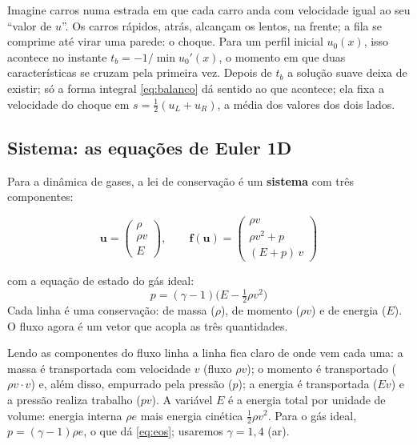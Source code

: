 \documentclass[10pt,a4paper]{article}
\newcommand{\vu}{\mathbf{u}}
\newcommand{\vf}{\mathbf{f}}
\begin{document}
\begin{intuicao}
Imagine carros numa estrada em que cada carro anda com velocidade igual ao seu ``valor de $u$''. Os carros rápidos, atrás, alcançam os lentos, na frente; a fila se comprime até virar uma parede: o choque. Para um perfil inicial $u_0(x)$, isso acontece no instante $t_b=-1/\min u_0'(x)$, o momento em que duas características se cruzam pela primeira vez. Depois de $t_b$ a solução suave deixa de existir; só a forma integral \eqref{eq:balanco} dá sentido ao que acontece; ela fixa a velocidade do choque em $s=\tfrac12(u_L+u_R)$, a média dos valores dos dois lados.
\end{intuicao}

\subsection{Sistema: as equações de Euler 1D}

Para a dinâmica de gases, a lei de conservação é um \textbf{sistema} com três componentes:
\begin{destaque}
\begin{equation}\label{eq:euler}
\vu=\begin{pmatrix}\rho\\ \rho v\\ E\end{pmatrix},\qquad
\vf(\vu)=\begin{pmatrix}\rho v\\ \rho v^2+p\\ (E+p)\,v\end{pmatrix}
\end{equation}
\end{destaque}
com a equação de estado do gás ideal:
\begin{equation}\label{eq:eos}
p=(\gamma-1)\big(E-\tfrac12\rho v^2\big)
\end{equation}
Cada linha é uma conservação: de massa ($\rho$), de momento ($\rho v$) e de energia ($E$). O fluxo agora é um vetor que acopla as três quantidades.

Lendo as componentes do fluxo linha a linha fica claro de onde vem cada uma: a massa é transportada com velocidade $v$ (fluxo $\rho v$); o momento é transportado ($\rho v\cdot v$) e, além disso, empurrado pela pressão ($p$); a energia é transportada ($Ev$) e a pressão realiza trabalho ($pv$). A variável $E$ é a energia total por unidade de volume: energia interna $\rho e$ mais energia cinética $\tfrac12\rho v^2$. Para o gás ideal, $p=(\gamma-1)\rho e$, o que dá \eqref{eq:eos}; usaremos $\gamma=1{,}4$ (ar).
\end{document}
